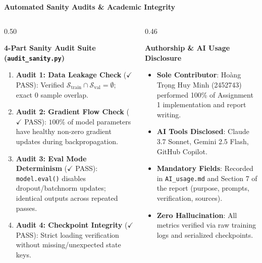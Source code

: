 \documentclass[aspectratio=169, 10pt]{beamer}
\begin{document}
\begin{frame}{\textbf{Automated Sanity Audits \& Academic Integrity}}
  \begin{columns}[c]
    \begin{column}{0.50\textwidth}
      \begin{block}{\textbf{4-Part Sanity Audit Suite (\texttt{audit\_sanity.py})}}
        \begin{enumerate}\scriptsize
          \item \textbf{Audit 1: Data Leakage Check} ($\checkmark$ PASS):
          Verified $\mathcal{S}_{\text{train}} \cap \mathcal{S}_{\text{val}} = \emptyset$; exact 0 sample overlap.
          \item \textbf{Audit 2: Gradient Flow Check} ($\checkmark$ PASS):
          $100\%$ of model parameters have healthy non-zero gradient updates during backpropagation.
          \item \textbf{Audit 3: Eval Mode Determinism} ($\checkmark$ PASS):
          \texttt{model.eval()} disables dropout/batchnorm updates; identical outputs across repeated passes.
          \item \textbf{Audit 4: Checkpoint Integrity} ($\checkmark$ PASS):
          Strict loading verification without missing/unexpected state keys.
        \end{enumerate}
      \end{block}
    \end{column}
    \begin{column}{0.46\textwidth}
      \begin{block}{\textbf{Authorship \& AI Usage Disclosure}}
        \begin{itemize}\scriptsize
          \item \textbf{Sole Contributor}: Hoàng Trọng Huy Minh (2452743) performed 100\% of Assignment 1 implementation and report writing.
          \item \textbf{AI Tools Disclosed}: Claude 3.7 Sonnet, Gemini 2.5 Flash, GitHub Copilot.
          \item \textbf{Mandatory Fields}: Recorded in \texttt{AI\_usage.md} and Section 7 of the report (purpose, prompts, verification, sources).
          \item \textbf{Zero Hallucination}: All metrics verified via raw training logs and serialized checkpoints.
        \end{itemize}
      \end{block}
    \end{column}
  \end{columns}
\end{frame}
\end{document}
